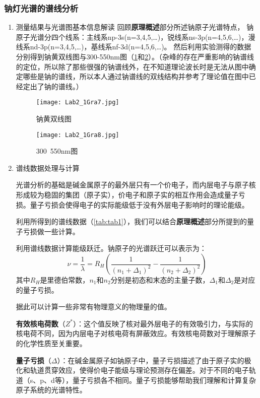 \documentclass[dvipsnames, svgnames,a4paper,11pt]{article}
\begin{document}
	\subsubsection{钠灯光谱的谱线分析}
	\begin{enumerate}
		\item 测量结果与光谱图基本信息解读
		回顾\textbf{原理概述}部分所述钠原子光谱特点，
		钠原子光谱分四个线系：主线系np-3s(n=3,4,5,…)，锐线系ns-3p(n=4,5,6,…)，漫线系nd-3p(n=3,4,5,…)，基线系nf-3d(n=4,5,6,…)。
		然后利用实验测得的数据分别得到钠黄双线图与300-550nm图（\cref{fig:fig7}和\cref{fig:fig8}）。（杂峰的存在严重影响的钠谱线的定位，所以除了那些很强的钠谱线外，在不知道理论波长时是无法从图中确定哪些是钠的谱线，所以本人通过钠谱线的双线结构并参考了理论值在图中已经定出了钠的谱线。）
		
		\begin{figure}[htbp]
			\centering
			\texttt{[image: Lab2\_1Gra7.jpg]}
			\caption{钠黄双线图}
			\label{fig:fig7}
		\end{figure}
		
		\begin{figure}[htbp]
			\centering
			\texttt{[image: Lab2\_1Gra8.jpg]}
			\caption{300~550nm图}
			\label{fig:fig8}
		\end{figure}
		
		\item 谱线数据处理与计算
		
		光谱分析的基础是碱金属原子的最外层只有一个价电子，而内层电子与原子核形成较为稳固的集团（原子实），价电子和原子实的相互作用会造成量子亏损。量子亏损会使得电子的实际能级低于没有外层电子影响时的理论能级。
		
		利用所得到的谱线数据（\cref{tab:tab1}），我们可以结合\textbf{原理概述}部分所提到的量子亏损做一些计算。
		
		利用谱线数据计算能级跃迁。钠原子的光谱跃迁可以表示为：
		\[
		\nu = \frac{1}{\lambda} = R_H \left( \frac{1}{(n_1 + \Delta_1)^2} - \frac{1}{(n_2 + \Delta_2)^2} \right)
		\]
		其中\( R_H \)是里德伯常数，\( n_1 \)和\( n_2 \)分别是初态和末态的主量子数，\( \Delta_1 \)和\( \Delta_2 \)是对应的量子亏损。
		
		据此可以计算一些非常有物理意义的物理量的值。
		
		\textbf{有效核电荷数}（\( Z^* \)）：这个值反映了核对最外层电子的有效吸引力，与实际的核电荷不同，因为内层电子对核电荷有屏蔽效应。有效核电荷数对于理解原子的化学性质至关重要。
		
		\textbf{量子亏损}（\( \Delta \)）：在碱金属原子如钠原子中，量子亏损描述了由于原子实的极化和轨道贯穿效应，使得价电子能级与理论预测存在偏差。对于不同的电子轨道（s、p、d等），量子亏损各不相同。量子亏损能够帮助我们理解和计算复杂原子系统的光谱特性。
		

\end{enumerate}
\end{document}
